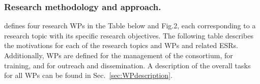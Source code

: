

\subsubsection{Research methodology and approach.}
\label{sec:metho}

\acronym defines four research WPs in the Table below and Fig.2, 
each corresponding to a research topic with its specific research objectives. 
The following table describes the motivations for each of the \acronym research topics and WPs and related ESRs. 
Additionally, WPs are defined for the management of the consortium, for training, and for outreach and dissemination.  
A description of the overall tasks for all WPs can be found in Sec.~\ref{sec:WPdescription}. 

